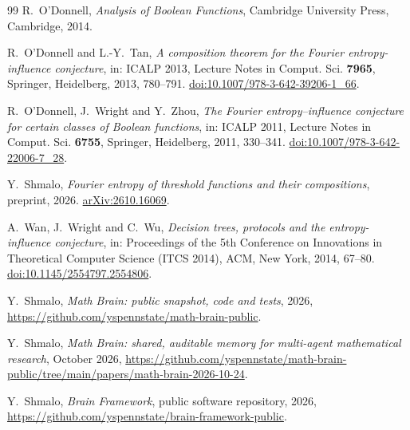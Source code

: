 \documentclass[11pt]{amsart}
\theoremstyle{definition}
\theoremstyle{remark}
\begin{document}
\begin{thebibliography}{99}
R.~O'Donnell,
\emph{Analysis of Boolean Functions},
Cambridge University Press, Cambridge, 2014.

R.~O'Donnell and L.-Y.~Tan,
\emph{A composition theorem for the Fourier entropy-influence conjecture},
in: ICALP 2013, Lecture Notes in Comput. Sci. \textbf{7965}, Springer, Heidelberg, 2013, 780--791.
\href{https://doi.org/10.1007/978-3-642-39206-1_66}{doi:10.1007/978-3-642-39206-1\_66}.

R.~O'Donnell, J.~Wright and Y.~Zhou,
\emph{The Fourier entropy--influence conjecture for certain classes of Boolean functions},
in: ICALP 2011, Lecture Notes in Comput. Sci. \textbf{6755}, Springer, Heidelberg, 2011, 330--341.
\href{https://doi.org/10.1007/978-3-642-22006-7_28}{doi:10.1007/978-3-642-22006-7\_28}.

Y.~Shmalo,
\emph{Fourier entropy of threshold functions and their compositions},
preprint, 2026.
\href{https://arxiv.org/abs/2610.16069}{arXiv:2610.16069}.

A.~Wan, J.~Wright and C.~Wu,
\emph{Decision trees, protocols and the entropy-influence conjecture},
in: Proceedings of the 5th Conference on Innovations in Theoretical Computer Science (ITCS 2014), ACM, New York, 2014, 67--80.
\href{https://doi.org/10.1145/2554797.2554806}{doi:10.1145/2554797.2554806}.

 Y.~Shmalo, \emph{Math Brain: public snapshot, code and tests}, 2026, \url{https://github.com/yspennstate/math-brain-public}.

 Y.~Shmalo, \emph{Math Brain: shared, auditable memory for multi-agent mathematical research}, October 2026, \url{https://github.com/yspennstate/math-brain-public/tree/main/papers/math-brain-2026-10-24}.

 Y.~Shmalo, \emph{Brain Framework}, public software repository, 2026, \url{https://github.com/yspennstate/brain-framework-public}.
\end{thebibliography}
\end{document}
